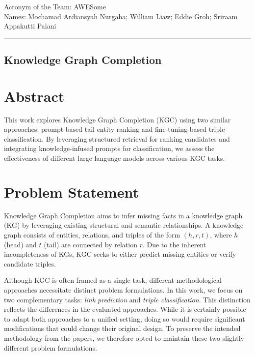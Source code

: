 \documentclass[12pt,a4paper]{article}
\begin{document}
\noindent Acronym of the Team: AWESome\\
Names: Mochamad Ardiansyah Nurgaha; William Liaw; Eddie Groh; Sriraam Appakutti Palani

    {\centering\rule{\linewidth}{.5pt}}

\begin{center}
    \section*{Knowledge Graph Completion}
\end{center}

%
%

\section{Abstract}

This work explores Knowledge Graph Completion (KGC) using two similar approaches: prompt-based tail entity ranking and fine-tuning-based triple classification.
By leveraging structured retrieval for ranking candidates and integrating knowledge-infused prompts for classification, we assess the effectiveness of different large language models across various KGC tasks.

%
%

\section{Problem Statement}\label{sec:problem-statement}

Knowledge Graph Completion aims to infer missing facts in a knowledge graph (KG) by leveraging existing structural and semantic relationships.
A knowledge graph consists of entities, relations, and triples of the form \( (h, r, t) \), where \( h \) (head) and \( t \) (tail) are connected by relation \( r \).
Due to the inherent incompleteness of KGs, KGC seeks to either predict missing entities or verify candidate triples.

Although KGC is often framed as a single task, different methodological approaches necessitate distinct problem formulations.
In this work, we focus on two complementary tasks: \emph{link prediction} and \emph{triple classification}.
This distinction reflects the differences in the evaluated approaches.
While it is certainly possible to adapt both approaches to a unified setting, doing so would require significant modifications that could change their original design.
To preserve the intended methodology from the papers, we therefore opted to maintain these two slightly different problem formulations.
\end{document}

